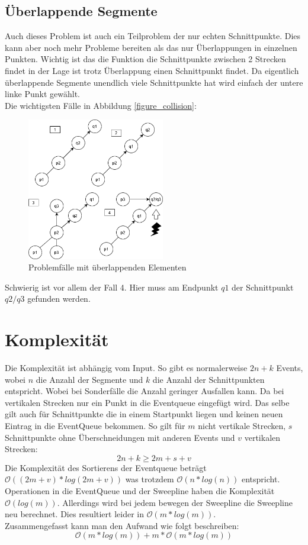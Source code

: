 \documentclass[conference]{IEEEtran}
\begin{document}
	\subsection{Überlappende Segmente}
	Auch dieses Problem ist auch ein Teilproblem der nur echten Schnittpunkte. Dies kann aber noch mehr Probleme bereiten als das nur Überlappungen in einzelnen Punkten. Wichtig ist das die Funktion die Schnittpunkte zwischen 2 Strecken findet in der Lage ist trotz Überlappung einen Schnittpunkt findet. Da eigentlich überlappende Segmente unendlich viele Schnittpunkte hat wird einfach der untere linke Punkt gewählt.\\
	Die wichtigsten Fälle in Abbildung \ref{figure_collision}:
	\begin{figure}[h]
		\begin{center}
			\includegraphics[width=6cm]{ProblemUberlappen.png}
			\caption{Problemfälle mit überlappenden Elementen}
			\label{figure_3}
		\end{center}
	\end{figure}
	Schwierig ist vor allem der Fall 4. Hier muss am Endpunkt $q1$ der Schnittpunkt $q2/q3$ gefunden werden.
	
	\section{Komplexität}
	Die Komplexität ist abhängig vom Input. So gibt es normalerweise $2n + k$ Events, wobei $n$ die Anzahl der Segmente und $k$ die Anzahl der Schnittpunkten entspricht. Wobei bei Sonderfälle die Anzahl geringer Ausfallen kann. Da bei vertikalen Strecken nur ein Punkt in die Eventqueue eingefügt wird. Das selbe gilt auch für Schnittpunkte die in einem Startpunkt liegen und keinen neuen Eintrag in die EventQueue bekommen. So gilt für $m$ nicht vertikale Strecken, $s$ Schnittpunkte ohne Überschneidungen mit anderen Events und $v$ vertikalen Strecken:
	\[ 2n + k \geq 2m + s + v \]
	Die Komplexität des Sortierens der Eventqueue beträgt $\mathcal{O}((2m+v)*log(2m+v))$ was trotzdem $\mathcal{O}(n*log(n))$ entspricht.\\
	Operationen in die EventQueue und der Sweepline haben die Komplexität $\mathcal{O}(log(m))$. Allerdings wird bei jedem bewegen der Sweepline die Sweepline neu berechnet. Dies resultiert leider in $\mathcal{O}(m*log(m))$.\\
	Zusammengefasst kann man den Aufwand wie folgt beschreiben:
	\[\mathcal{O}(m*log(m)) + m*\mathcal{O}(m*log(m)) \]
	
\end{document}
